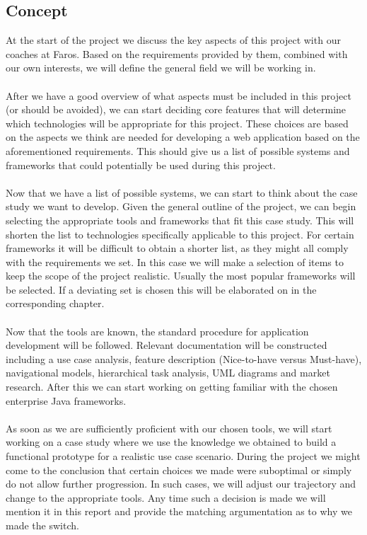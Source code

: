 \documentclass[12pt]{article}
\begin{document}
\begin{multicols}{2}
\subsection{Concept}\label{sec:concept}
At the start of the project we discuss the key aspects of this project with our coaches at Faros. Based on the requirements provided by them, combined with our own interests, we will define the general field we will be working in. 
\\\\
After we have a good overview of what aspects must be included in this project (or should be avoided), we can start deciding core features that will determine which technologies will be appropriate for this project. These choices are based on the aspects we think are needed for developing a web application based on the aforementioned requirements. This should give us a list of possible systems and frameworks that could potentially be used during this project.
\\\\
Now that we have a list of possible systems, we can start to think about the case study we want to develop. Given the general outline of the project, we can begin selecting the appropriate tools and frameworks that fit this case study. This will shorten the list to technologies specifically applicable to this project. For certain frameworks it will be difficult to obtain a shorter list, as they might all comply with the requirements we set. In this case we will make a selection of items to keep the scope of the project realistic. Usually the most popular frameworks will be selected. If a deviating set is chosen this will be elaborated on in the corresponding chapter.
\\\\
Now that the tools are known, the standard procedure for application development will be followed. Relevant documentation will be constructed including a use case analysis, feature description (Nice-to-have versus Must-have), navigational models, hierarchical task analysis, UML diagrams and market research. After this we can start working on getting familiar with the chosen enterprise Java frameworks.
\\\\
As soon as we are sufficiently proficient with our chosen tools, we will start working on a case study where we use the knowledge we obtained to build a functional prototype for a realistic use case scenario. During the project we might come to the conclusion that certain choices we made were suboptimal or simply do not allow further progression. In such cases, we will adjust our trajectory and change to the appropriate tools. Any time such a decision is made we will mention it in this report and provide the matching argumentation as to why we made the switch.

\end{multicols}
\end{document}
